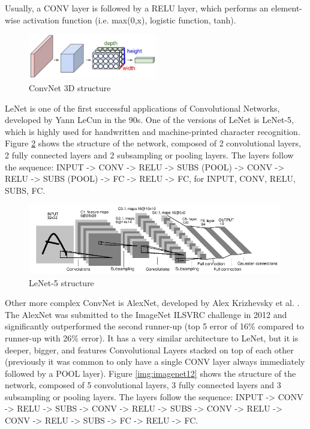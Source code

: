 \documentclass[]{article}
\begin{document}
Usually, a CONV layer is followed by a RELU layer, which performs an element-wise activation function (i.e. max(0,x), logistic function, tanh).

\begin{figure}[htpb!]
\centering
\includegraphics[width= 0.5\textwidth]{images/cnn}
\caption{ConvNet 3D structure \cite{cs231convnets}\label{img:cnn}}
\end{figure}

LeNet is one of the first successful applications of Convolutional Networks, developed by Yann LeCun in the 90s. One of the versions of LeNet is LeNet-5, which is highly used for handwritten and machine-printed character recognition. Figure \ref{img:lenet5} shows the structure of the network, composed of 2 convolutional layers, 2 fully connected layers and 2 subsampling or pooling layers. The layers follow the sequence: INPUT -> CONV -> RELU -> SUBS (POOL) -> CONV -> RELU -> SUBS (POOL) -> FC -> RELU -> FC, for INPUT, CONV, RELU, SUBS, FC. %
\begin{figure}[htpb!]
\centering
\includegraphics[width= 0.99\textwidth]{images/lenet5}
\caption{LeNet-5 structure \cite{Lecun98} \label{img:lenet5}}
\end{figure}

Other more complex ConvNet is AlexNet, developed by Alex Krizhevsky et al. \cite{Krizhevsky12}. The AlexNet was submitted to the ImageNet ILSVRC challenge in 2012 and significantly outperformed the second runner-up (top 5 error of 16\% compared to runner-up with 26\% error). It has a very similar architecture to LeNet, but it is  deeper, bigger, and features Convolutional Layers stacked on top of each other (previously it was common to only have a single CONV layer always immediately followed by a POOL layer)\cite{cs231convnets}. Figure \ref{img:imagenet12} shows the structure of the network, composed of 5 convolutional layers, 3 fully connected layers and 3 subsampling or pooling layers. The layers follow the sequence: INPUT -> CONV -> RELU -> SUBS -> CONV -> RELU -> SUBS -> CONV -> RELU -> CONV -> RELU -> SUBS -> FC -> RELU -> FC. %
\end{document}
